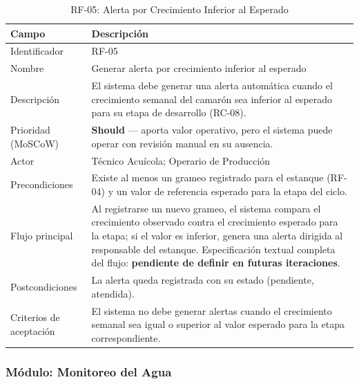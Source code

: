 \documentclass[12pt,a4paper]{article}
\begin{document}
\begin{table}[H]
\centering
\caption{RF-05: Alerta por Crecimiento Inferior al Esperado}
\begin{tabular}{|p{3.6cm}|p{10.4cm}|}
\hline
\textbf{Campo} & \textbf{Descripción} \\
\hline
Identificador & RF-05 \\ \hline
Nombre & Generar alerta por crecimiento inferior al esperado \\ \hline
Descripción & El sistema debe generar una alerta automática cuando el
crecimiento semanal del camarón sea inferior al esperado para su etapa de
desarrollo (RC-08). \\ \hline
Prioridad (MoSCoW) & \textbf{Should} --- aporta valor operativo, pero el
sistema puede operar con revisión manual en su ausencia. \\ \hline
Actor & Técnico Acuícola; Operario de Producción \\ \hline
Precondiciones & Existe al menos un grameo registrado para el estanque
(RF-04) y un valor de referencia esperado para la etapa del ciclo. \\ \hline
Flujo principal & Al registrarse un nuevo grameo, el sistema compara el
crecimiento observado contra el crecimiento esperado para la etapa; si el valor
es inferior, genera una alerta dirigida al responsable del estanque.
Especificación textual completa del flujo: \textbf{pendiente de definir en
futuras iteraciones}. \\ \hline
Postcondiciones & La alerta queda registrada con su estado (pendiente,
atendida). \\ \hline
Criterios de aceptación & El sistema no debe generar alertas cuando el
crecimiento semanal sea igual o superior al valor esperado para la etapa
correspondiente. \\ \hline
\end{tabular}
\end{table}

\subsubsection{Módulo: Monitoreo del Agua}
\end{document}
